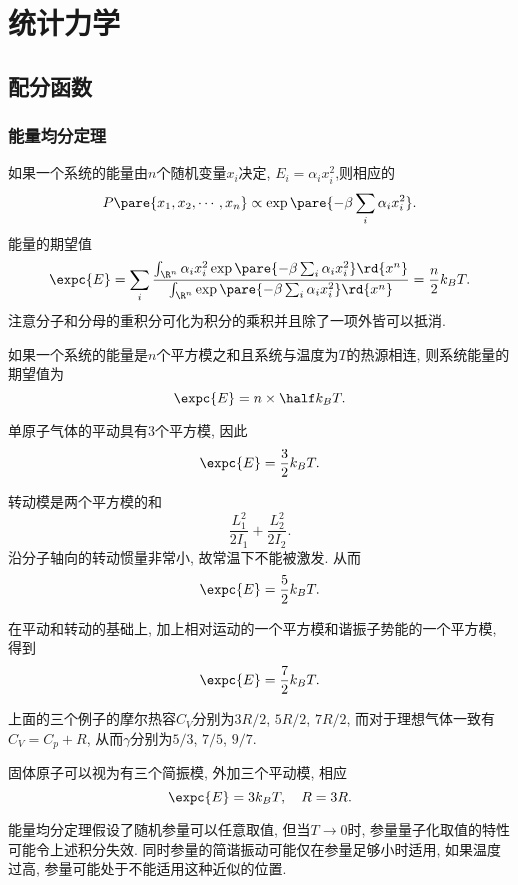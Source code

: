 \documentclass[../Thermal.tex]{subfiles}
\begin{document}
\section{统计力学}
\subsection{配分函数}
\subsubsection{能量均分定理}
如果一个系统的能量由$n$个随机变量$x_i$决定, $E_i = \alpha_i x_i^2$,则相应的
\[ P\pare{x_1, x_2, \cdots, x_n} \propto \exp\pare{-\beta \sum_i \alpha_i x_i^2}. \]
能量的期望值
\[ \expc{E} = \sum_i \frac{\int_{\R^n} \alpha_i x_i^2 \exp\pare{-\beta\sum_i \alpha_i x_i^2} \rd{x^n}}{\int_{\R^n} \exp\pare{-\beta\sum_i \alpha_i x_i^2} \rd{x^n}} = \frac{n}{2}k_BT. \]
注意分子和分母的重积分可化为积分的乘积并且除了一项外皆可以抵消.
\begin{finale}
\begin{theorem}[能量均分定理]
如果一个系统的能量是$n$个平方模之和且系统与温度为$T$的热源相连, 则系统能量的期望值为
\[ \expc{E} = n\times \half k_B T. \]
\end{theorem}
\end{finale}
\begin{ex}[单原子气体的平动]
单原子气体的平动具有$3$个平方模, 因此
\[ \expc{E} = \frac{3}{2} k_B T. \]
\end{ex}
\begin{ex}[双原子气体的转动]
转动模是两个平方模的和
\[ \frac{L_1^2}{2I_1} + \frac{L_2^2}{2I_2}. \]
沿分子轴向的转动惯量非常小, 故常温下不能被激发. 从而
\[ \expc{E} = \frac{5}{2} k_BT. \]
\end{ex}
\begin{ex}[双原子气体的振动]
在平动和转动的基础上, 加上相对运动的一个平方模和谐振子势能的一个平方模, 得到
\[ \expc{E} = \frac{7}{2} k_BT. \]
\end{ex}
\begin{ex}
上面的三个例子的摩尔热容$C_V$分别为$3R/2$, $5R/2$, $7R/2$, 而对于理想气体一致有$C_V = C_p + R$, 从而$\gamma$分别为$5/3$, $7/5$, $9/7$.
\end{ex}
\begin{ex}
固体原子可以视为有三个简振模, 外加三个平动模, 相应
\[ \expc{E} = 3k_BT,\quad R = 3R. \]
\end{ex}
\begin{remark}
能量均分定理假设了随机参量可以任意取值, 但当$T\rightarrow 0$时, 参量量子化取值的特性可能令上述积分失效. 同时参量的简谐振动可能仅在参量足够小时适用, 如果温度过高, 参量可能处于不能适用这种近似的位置.
\end{remark}
\end{document}
